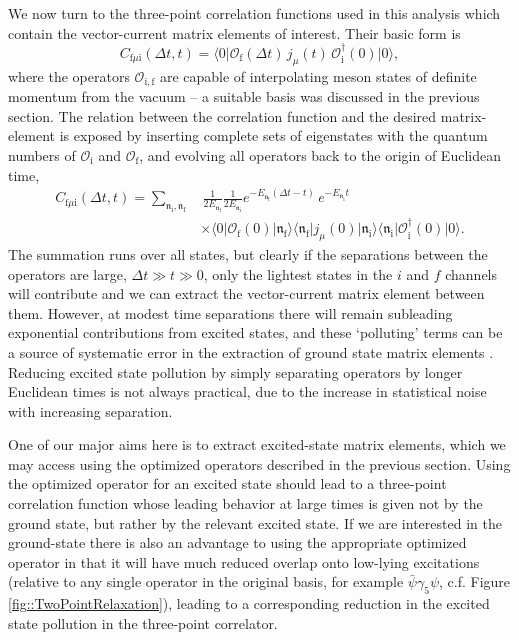 \documentclass[twocolumn,amsmath,amssymb,prd,10pt,floatfix, 
superscriptaddress,nofootinbib, showpacs, preprintnumbers]{revtex4-1}
\begin{document}
We now turn to the three-point correlation functions used in this analysis which contain the vector-current matrix elements of interest. Their basic form is
\begin{equation*}
	C_{\mathrm{f} \mu \mathrm{i}}(\Delta t, t) = \big\langle 0 \big| \mathcal{O}^{\,}_\mathrm{f}(\Delta t) \, j_\mu(t) \, \mathcal{O}^\dag_\mathrm{i}(0) \big| 0 \big\rangle,
\end{equation*}
where the operators $\mathcal{O}_{\mathrm{i,f}}$ are capable of interpolating meson states of definite momentum from the vacuum -- a suitable basis was discussed in the previous section. The relation between the correlation function and the desired matrix-element is exposed by inserting complete sets of eigenstates with the quantum numbers of $\mathcal{O}_\mathrm{i}$ and $\mathcal{O}_\mathrm{f}$, and evolving all operators back to the origin of Euclidean time,
\begin{align}
	C_{\mathrm{f} \mu \mathrm{i}}(\Delta t, t) = \sum_{\mathfrak{n}_\mathrm{i},\mathfrak{n}_\mathrm{f} }& 
		\, \frac{1}{2 E_{\mathfrak{n}_\mathrm{f}} } \frac{1}{2 E_{\mathfrak{n}_\mathrm{i}} }
		e^{-E_{\mathfrak{n}_\mathrm{f}}(\Delta t - t)} \,  e^{-E_{\mathfrak{n}_\mathrm{i}}t}  \nonumber \\
	& \times \big\langle 0 \big| \mathcal{O}^{\,}_\mathrm{f}(0) \big| \mathfrak{n}_\mathrm{f} \big\rangle 
	 \big\langle \mathfrak{n}_\mathrm{f} \big| j_\mu(0) \big| \mathfrak{n}_\mathrm{i} \big\rangle 
	\big\langle \mathfrak{n}_\mathrm{i} \big| \mathcal{O}^\dag_\mathrm{i}(0) \big| 0 \big\rangle \nonumber.
\end{align}
The summation runs over all states, but clearly if the separations between the operators are large, $\Delta t \gg t \gg 0$, only the lightest states in the $i$ and $f$ channels will contribute and we can extract the vector-current matrix element between them. However, at modest time separations there will remain subleading exponential contributions from excited states, and these `polluting' terms can be a source of systematic error in the extraction of ground state matrix elements \cite{Aznauryan:2012ba,PhysRevD.83.045010,Horsley:2013ayv,PhysRevLett.96.052001,PhysRevLett.100.171602,Lin:2012ev,Bali:2014gha,Dinter:2011sg,Green:2014xba}. Reducing excited state pollution by simply separating operators by longer Euclidean times is not always practical, due to the increase in statistical noise with increasing separation.

One of our major aims here is to extract excited-state matrix elements, which we may access using the optimized operators described in the previous section. Using the optimized operator for an excited state should lead to a three-point correlation function whose leading behavior at large times is given not by the ground state, but rather by the relevant excited state. If we are interested in the ground-state there is also an advantage to using the appropriate optimized operator in that it will have much reduced overlap onto low-lying excitations (relative to any single operator in the original basis, for example $\bar{\psi} \gamma_5 \psi$, c.f. Figure \ref{fig::TwoPointRelaxation}), leading to a corresponding reduction in the excited state pollution in the three-point correlator.  
\end{document}
